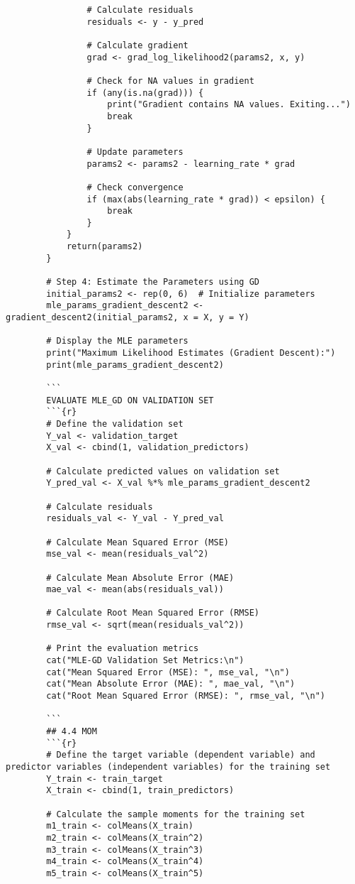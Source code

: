 \documentclass[12pt]{article}
\begin{document}
\begin{lstlisting}
				# Calculate residuals
				residuals <- y - y_pred
				
				# Calculate gradient
				grad <- grad_log_likelihood2(params2, x, y)
				
				# Check for NA values in gradient
				if (any(is.na(grad))) {
					print("Gradient contains NA values. Exiting...")
					break
				}
				
				# Update parameters
				params2 <- params2 - learning_rate * grad
				
				# Check convergence
				if (max(abs(learning_rate * grad)) < epsilon) {
					break
				}
			}
			return(params2)
		}
		
		# Step 4: Estimate the Parameters using GD
		initial_params2 <- rep(0, 6)  # Initialize parameters
		mle_params_gradient_descent2 <- gradient_descent2(initial_params2, x = X, y = Y)
		
		# Display the MLE parameters
		print("Maximum Likelihood Estimates (Gradient Descent):")
		print(mle_params_gradient_descent2)
		
		```
		EVALUATE MLE_GD ON VALIDATION SET
		```{r}
		# Define the validation set
		Y_val <- validation_target
		X_val <- cbind(1, validation_predictors)
		
		# Calculate predicted values on validation set
		Y_pred_val <- X_val %*% mle_params_gradient_descent2
		
		# Calculate residuals
		residuals_val <- Y_val - Y_pred_val
		
		# Calculate Mean Squared Error (MSE)
		mse_val <- mean(residuals_val^2)
		
		# Calculate Mean Absolute Error (MAE)
		mae_val <- mean(abs(residuals_val))
		
		# Calculate Root Mean Squared Error (RMSE)
		rmse_val <- sqrt(mean(residuals_val^2))
		
		# Print the evaluation metrics
		cat("MLE-GD Validation Set Metrics:\n")
		cat("Mean Squared Error (MSE): ", mse_val, "\n")
		cat("Mean Absolute Error (MAE): ", mae_val, "\n")
		cat("Root Mean Squared Error (RMSE): ", rmse_val, "\n")
		
		```
		## 4.4 MOM
		```{r}
		# Define the target variable (dependent variable) and predictor variables (independent variables) for the training set
		Y_train <- train_target
		X_train <- cbind(1, train_predictors)
		
		# Calculate the sample moments for the training set
		m1_train <- colMeans(X_train)
		m2_train <- colMeans(X_train^2)
		m3_train <- colMeans(X_train^3)
		m4_train <- colMeans(X_train^4)
		m5_train <- colMeans(X_train^5)
		

\end{lstlisting}
\end{document}
